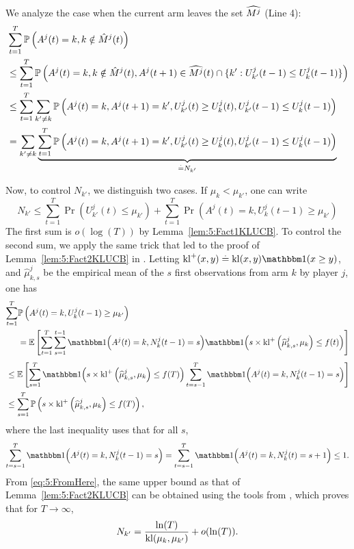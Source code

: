\begin{smallproof}
  We analyze the case when the current arm leaves the set $\widehat{M^j}$ (Line 4):
  \begin{align*}
    & \sum_{t=1}^T \mathbb{P}\left(A^j(t) = k, k \notin \hat{M}^j(t)\right)  \\ & \leq \sum_{t=1}^T \mathbb{P}\left(A^j(t) = k, k \notin \hat{M}^j(t), A^j(t+1) \in \widehat{M^j}(t) \cap \{k': U_{k'}^j(t-1) \leq U_k^j(t-1)\}\right) \\
    & \leq   \sum_{t=1}^T \sum_{k' \neq k}\mathbb{P}\left(A^j(t) = k,A^j(t+1) = k', U_{k'}^j(t) \geq U_{k}^j(t), U_{k'}^j(t-1) \leq U_{k}^j(t-1)  \right) \\
    & = \sum_{k' \neq k} \underbrace{\sum_{t=1}^T \mathbb{P}\left(A^j(t) = k,A^j(t+1) = k', U_{k'}^j(t) \geq U_{k}^j(t), U_{k'}^j(t-1) \leq U_{k}^j(t-1)  \right)}_{ \overset{.}{=} N_{k'}}
  \end{align*}

  Now, to control $N_{k'}$, we distinguish two cases. If $\mu_k < \mu_{k'}$, one can write
  \[N_{k'} \leq \sum_{t=1}^T \Pr\left(U_{k'}^j(t) \leq \mu_{k'}\right) + \sum_{t=1}^T \Pr\left(A^j(t) = k, U_{k}^j(t-1) \geq \mu_{k'}\right)\]
  The first sum is $o(\log(T))$ by Lemma~\ref{lem:5:Fact1KLUCB}.
  To control the second sum, we apply the same trick that led to the proof of Lemma~\ref{lem:5:Fact2KLUCB} in \cite{KLUCBJournal}.
  Letting $\kl^+(x, y) \eqdef \kl(x, y) \indic(x \geq y)$,
  and $\widehat{\mu}^j_{k,s}$ be the empirical mean of the $s$ first observations from arm $k$ by player $j$, one has
  \begin{align*}
    \sum_{t=1}^T & \Pr\left(A^j(t) = k, U_{k}^j(t-1) \geq \mu_{k'}\right) \\
    & =  \bE \left[ \sum_{t=1}^T\sum_{s=1}^{t-1} \indic{\left(A^j(t) = k , N^j_k(t-1) = s\right)}\indic{\left( s  \times \kl^+\left(\widehat{\mu}_{k,s}^j , \mu_k\right) \leq f(t)\right)} \right]
  \end{align*}
  \begin{align}
    & \leq \bE \left[ \sum_{s=1}^{T}\indic{\left( s \times \kl^+\left(\widehat{\mu}_{k,s}^j , \mu_k\right) \leq f(T)\right)}\sum_{t=s-1}^T \indic{\left(A^j(t) = k , N^j_k(t-1) = s\right)} \right] \nonumber \\
    & \leq \sum_{s=1}^T \Pr\left( s \times \kl^+\left(\widehat{\mu}_{k,s}^j , \mu_k\right) \leq f(T)\right),\label{eq:5:FromHere}
  \end{align}
  where the last inequality uses that for all $s$, \[\sum_{t=s-1}^T \indic{\left(A^j(t) = k , N^j_k(t-1) = s\right)} = \sum_{t=s-1}^T \indic{\left(A^j(t) = k , N^j_k(t) = s + 1\right)} \leq 1.\]
  From \eqref{eq:5:FromHere}, the same upper bound as that of Lemma~\ref{lem:5:Fact2KLUCB} can be obtained using the tools from \cite{KLUCBJournal}, which proves that for $T\to\infty$,
  \[N_{k'} = \frac{\ln(T)}{\mathrm{kl}(\mu_k,\mu_{k'})} + o(\ln(T)).\]


\end{smallproof}

